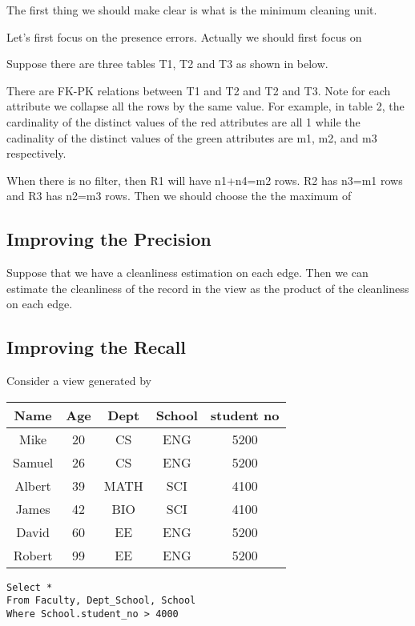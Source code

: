 The first thing we should make clear is what is the minimum cleaning unit. 

Let’s first focus on the presence errors. Actually we should first focus on 

Suppose there are three tables T1, T2 and T3 as shown in below.


There are FK-PK relations between T1 and T2 and T2 and T3. Note for each attribute we collapse all the rows by the same value. For example, in table 2, the cardinality of the distinct values of the red attributes are all 1 while the cadinality of the distinct values of the green attributes are m1, m2, and m3 respectively.


When there is no filter, then R1 will have n1+n4=m2 rows. R2 has n3=m1 rows and R3 has n2=m3 rows. Then we should choose the the maximum of 

\subsection{Improving the Precision}
Suppose that we have a cleanliness estimation on each edge. Then we can estimate the cleanliness of the record in the view as the product of the cleanliness on each edge.

\subsection{Improving the Recall}
Consider a view generated by 

\begin{table}
\centering
\begin{tabular}{|c|c|c|c|c|} \hline
Name & Age & Dept & School & student no \\\hline
Mike & 20  & CS   & ENG &  5200 \\\hline
Samuel & 26  & CS   & ENG &  5200 \\\hline
Albert & 39  & MATH & SCI &  4100 \\\hline
James  & 42  & BIO  & SCI &  4100 \\\hline
David  & 60  & EE   & ENG &  5200 \\\hline
Robert & 99  & EE   & ENG &  5200 \\\hline
\end{tabular}
\end{table}

\lstset{language=SQL}
\begin{lstlisting}
Select *
From Faculty, Dept_School, School
Where School.student_no > 4000
\end{lstlisting}
\fi



